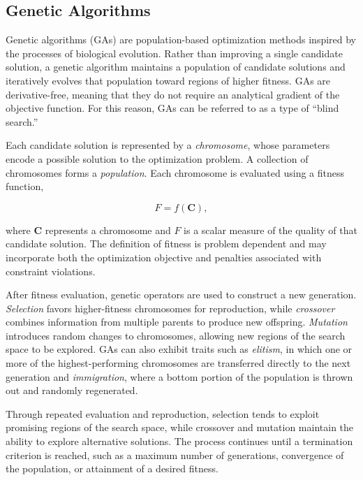 \documentclass[11pt]{article}
\begin{document}
\subsection{Genetic Algorithms}

Genetic algorithms (GAs) are population-based optimization methods inspired by the processes of biological evolution. Rather than improving a single candidate solution, a genetic algorithm maintains a population of candidate solutions and iteratively evolves that population toward regions of higher fitness. GAs are derivative-free, meaning that they do not require an analytical gradient of the objective function. For this reason, GAs can be referred to as a type of ``blind search.''

Each candidate solution is represented by a \textit{chromosome}, whose parameters encode a possible solution to the optimization problem. A collection of chromosomes forms a \textit{population}. Each chromosome is evaluated using a fitness function,

\begin{equation}
    F = f(\mathbf{C}),
\end{equation}

where $\mathbf{C}$ represents a chromosome and $F$ is a scalar measure of the quality of that candidate solution. The definition of fitness is problem dependent and may incorporate both the optimization objective and penalties associated with constraint violations.

After fitness evaluation, genetic operators are used to construct a new generation. \textit{Selection} favors higher-fitness chromosomes for reproduction, while \textit{crossover} combines information from multiple parents to produce new offspring. \textit{Mutation} introduces random changes to chromosomes, allowing new regions of the search space to be explored. GAs can also exhibit traits such as \textit{elitism}, in which one or more of the highest-performing chromosomes are transferred directly to the next generation and \textit{immigration}, where a bottom portion of the population is thrown out and randomly regenerated.

Through repeated evaluation and reproduction, selection tends to exploit promising regions of the search space, while crossover and mutation maintain the ability to explore alternative solutions. The process continues until a termination criterion is reached, such as a maximum number of generations, convergence of the population, or attainment of a desired fitness.
\end{document}
